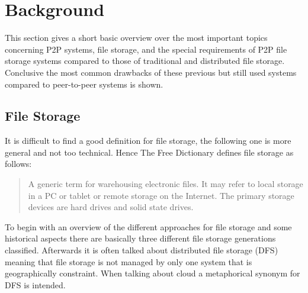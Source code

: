 \section{Background} %
\label{sec:background}
This section gives a short basic overview over the most important topics concerning P2P systems, file storage, and the special requirements of P2P file storage systems compared to those of traditional and distributed file storage. Conclusive the most common drawbacks of these previous but still used systems compared to peer-to-peer systems is shown.

\subsection{File Storage}
It is difficult to find a good definition for file storage, the following one is more general and not too technical. Hence The Free Dictionary defines file storage as follows:
\begin{quote}
A generic term for warehousing electronic files. It may refer to local storage in a PC or tablet or remote storage on the Internet. The primary storage devices are hard drives and solid state drives\cite{thefreedictionary}.
\end{quote}
To begin with an overview of the different approaches for file storage and some historical aspects there are basically three different file storage generations classified. Afterwards it is often talked about distributed file storage (DFS) meaning that file storage is not managed by only one system that is geographically constraint. When talking about cloud a metaphorical synonym for DFS is intended.


